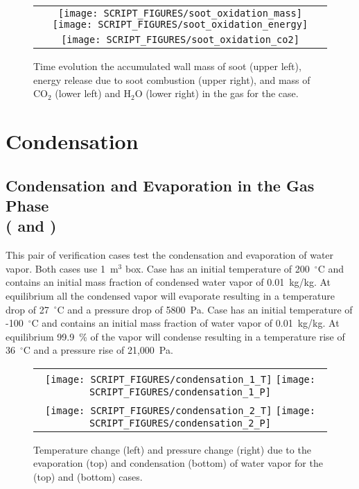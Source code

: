 \documentclass[11pt]{book}
\begin{document}
\begin{figure}[ht]
    \centering
    \begin{tabular}{c}
        \texttt{[image: SCRIPT\_FIGURES/soot\_oxidation\_mass]}
        \texttt{[image: SCRIPT\_FIGURES/soot\_oxidation\_energy]} \\
        \texttt{[image: SCRIPT\_FIGURES/soot\_oxidation\_co2]}
    \end{tabular}
    \caption[Results of the  case]{Time evolution the accumulated wall mass of soot (upper left), energy release due to soot combustion (upper right), and mass of CO$_2$ (lower left) and H$_2$O (lower right) in the gas for the  case.}
    \label{fig:soot_oxidation}
\end{figure}

\section{Condensation}
\subsection{Condensation and Evaporation in the Gas Phase\\(\texorpdfstring{ and }{condensation\_1 and condensation\_2})}
    \label{condensation_evaporation}
This pair of verification cases test the condensation and evaporation of water vapor. Both cases use 1~m$^3$ box. Case  has an initial temperature of 200~$^\circ$C and contains an initial mass fraction of condensed water vapor of 0.01~kg/kg. At equilibrium all the condensed vapor will evaporate resulting in a temperature drop of 27~$^\circ$C and a pressure drop of 5800~Pa. Case  has an initial temperature of -100~$^\circ$C and contains an initial mass fraction of water vapor of 0.01~kg/kg. At equilibrium 99.9~\% of the vapor will condense resulting in a temperature rise of 36~$^\circ$C and a pressure rise of 21,000~Pa.

\begin{figure}[ht]
    \centering
    \begin{tabular}{c}
        \texttt{[image: SCRIPT\_FIGURES/condensation\_1\_T]}
        \texttt{[image: SCRIPT\_FIGURES/condensation\_1\_P]} \\
        \texttt{[image: SCRIPT\_FIGURES/condensation\_2\_T]}
        \texttt{[image: SCRIPT\_FIGURES/condensation\_2\_P]}
    \end{tabular}
    \caption[Results of the  (top) and  (bottom) cases]{Temperature change (left) and pressure change (right) due to the evaporation (top) and condensation (bottom) of water vapor for the  (top) and  (bottom) cases.}
    \label{fig:condensation_gas}
\end{figure}
\end{document}
